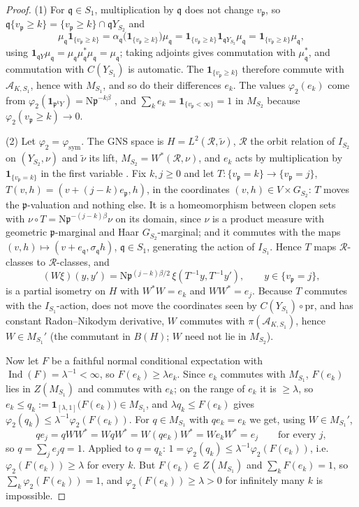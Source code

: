 \documentclass[11pt]{amsart}
\numberwithin{equation}{section}
\theoremstyle{definition}
\theoremstyle{remark}
\newcommand{\cA}{\mathcal{A}}
\newcommand{\pp}{\mathfrak{p}}
\newcommand{\qq}{\mathfrak{q}}
\newcommand{\Ns}{\mathrm{N}}
\newcommand{\Ind}{\operatorname{Ind}}
\newcommand{\cR}{\mathcal{R}}
\newcommand{\phisym}{\varphi_{\mathrm{sym}}}
\begin{document}
\begin{proof}
(1) For $\qq\in S_1$, multiplication by $\qq$ does not change $v_\pp$, so
$\qq\{v_\pp\ge k\}=\{v_\pp\ge k\}\cap\qq Y_{S_2}$ and
\[
\mu_\qq\mathbf 1_{\{v_\pp\ge k\}}=\alpha_\qq\bigl(\mathbf 1_{\{v_\pp\ge k\}}\bigr)\mu_\qq
=\mathbf 1_{\{v_\pp\ge k\}}\mathbf 1_{\qq Y_{S_2}}\mu_\qq=\mathbf 1_{\{v_\pp\ge k\}}\mu_\qq ,
\]
using $\mathbf 1_{\qq Y}\mu_\qq=\mu_\qq\mu_\qq^*\mu_\qq=\mu_\qq$; taking adjoints gives
commutation with $\mu_\qq^*$, and commutation with $C(Y_{S_1})$ is automatic. The
$\mathbf 1_{\{v_\pp\ge k\}}$ therefore commute with $\cA_{K,S_1}$, hence with $M_{S_1}$, and so
do their differences $e_k$. The values $\varphi_2(e_k)$ come from
$\varphi_2(\mathbf 1_{\pp^kY})=\Ns\pp^{-k\beta}$ \cite[Prop.~2.8]{Main}, and
$\sum_ke_k=\mathbf 1_{\{v_\pp<\infty\}}=1$ in $M_{S_2}$ because $\varphi_2(v_\pp\ge k)\to0$.

(2) Let $\varphi_2=\phisym$. The GNS space is $H=L^2(\cR,\tilde\nu)$, $\cR$ the orbit
relation of $I_{S_2}$ on $(Y_{S_2},\nu)$ and $\tilde\nu$ its lift, $M_{S_2}=W^*(\cR,\nu)$,
and $e_k$ acts by multiplication by $\mathbf 1_{\{v_\pp=k\}}$ in the first variable
\cite[Prop.~6.1]{Main}. Fix $k,j\ge0$ and let $T:\{v_\pp=k\}\to\{v_\pp=j\}$,
$T(v,h)=(v+(j-k)e_\pp,h)$, in the coordinates $(v,h)\in V\times G_{S_2}$: $T$ moves the
$\pp$-valuation and nothing else. It is a homeomorphism between clopen sets with
$\nu\circ T=\Ns\pp^{-(j-k)\beta}\nu$ on its domain, since $\nu$ is a product measure with
geometric $\pp$-marginal and Haar $G_{S_2}$-marginal; and it commutes with the maps
$(v,h)\mapsto(v+e_\qq,\sigma_\qq h)$, $\qq\in S_1$, generating the action of $I_{S_1}$. Hence
$T$ maps $\cR$-classes to $\cR$-classes, and
\[
(W\xi)(y,y')=\Ns\pp^{(j-k)\beta/2}\,\xi(T^{-1}y,T^{-1}y'),\qquad y\in\{v_\pp=j\},
\]
is a partial isometry on $H$ with $W^*W=e_k$ and $WW^*=e_j$. Because $T$ commutes with the
$I_{S_1}$-action, does not move the coordinates seen by $C(Y_{S_1})\circ\mathrm{pr}$, and
has constant Radon--Nikodym derivative, $W$ commutes with $\pi(\cA_{K,S_1})$, hence
$W\in M_{S_1}'$ (the commutant in $B(H)$; $W$ need not lie in $M_{S_2}$).

Now let $F$ be a faithful normal conditional expectation with $\Ind(F)=\lambda^{-1}<\infty$,
so $F(e_k)\ge\lambda e_k$. Since $e_k$ commutes with $M_{S_1}$, $F(e_k)$ lies in
$Z(M_{S_1})$ and commutes with $e_k$; on the range of $e_k$ it is $\ge\lambda$, so
$e_k\le q_k:=\mathbf 1_{[\lambda,1]}\bigl(F(e_k)\bigr)\in M_{S_1}$, and
$\lambda q_k\le F(e_k)$ gives $\varphi_2(q_k)\le\lambda^{-1}\varphi_2(F(e_k))$. For $q\in M_{S_1}$
with $qe_k=e_k$ we get, using $W\in M_{S_1}'$,
\[
qe_j=qWW^*=WqW^*=W(qe_k)W^*=We_kW^*=e_j\qquad\text{for every }j,
\]
so $q=\sum_je_jq=1$. Applied to $q=q_k$: $1=\varphi_2(q_k)\le\lambda^{-1}\varphi_2(F(e_k))$,
i.e.\ $\varphi_2(F(e_k))\ge\lambda$ for every $k$. But $F(e_k)\in Z(M_{S_1})$ and
$\sum_kF(e_k)=1$, so $\sum_k\varphi_2(F(e_k))=1$, and $\varphi_2(F(e_k))\ge\lambda>0$ for
infinitely many $k$ is impossible.
\end{proof}
\end{document}
